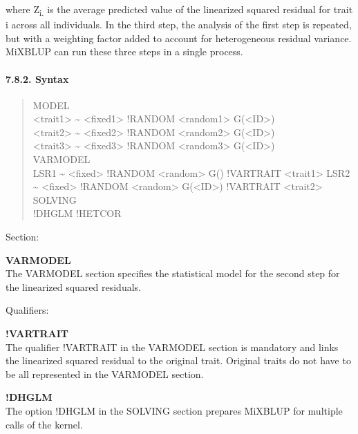 where Z\textsubscript{i.} is the average predicted value of the
linearized squared residual for trait i across all individuals. In the
third step, the analysis of the first step is repeated, but with a
weighting factor added to account for heterogeneous residual variance.
MiXBLUP can run these three steps in a single process.

\paragraph{7.8.2. Syntax}\label{Stat39}

\begin{quote}
MODEL\\
\textless trait1\textgreater{} \textasciitilde{}
\textless fixed1\textgreater{} !RANDOM \textless random1\textgreater{}
G(\textless ID\textgreater)\\
\textless trait2\textgreater{} \textasciitilde{}
\textless fixed2\textgreater{} !RANDOM \textless random2\textgreater{}
G(\textless ID\textgreater)\\
\textless trait3\textgreater{} \textasciitilde{}
\textless fixed3\textgreater{} !RANDOM \textless random3\textgreater{}
G(\textless ID\textgreater)\\
VARMODEL\\
LSR1 \textasciitilde{} \textless fixed\textgreater{} !RANDOM
\textless random\textgreater{} G() !VARTRAIT
\textless trait1\textgreater{} LSR2 \textasciitilde{}
\textless fixed\textgreater{} !RANDOM \textless random\textgreater{}
G(\textless ID\textgreater) !VARTRAIT \textless trait2\textgreater{}\\
SOLVING\\
!DHGLM !HETCOR
\end{quote}

Section:

\textbf{VARMODEL}\\
The VARMODEL section specifies the statistical model for the second step
for the linearized squared residuals.

Qualifiers:

\textbf{!VARTRAIT}\\
The qualifier !VARTRAIT in the VARMODEL section is mandatory and links
the linearized squared residual to the original trait. Original traits
do not have to be all represented in the VARMODEL section.

\textbf{!DHGLM}\\
The option !DHGLM in the SOLVING section prepares MiXBLUP for multiple
calls of the kernel.

